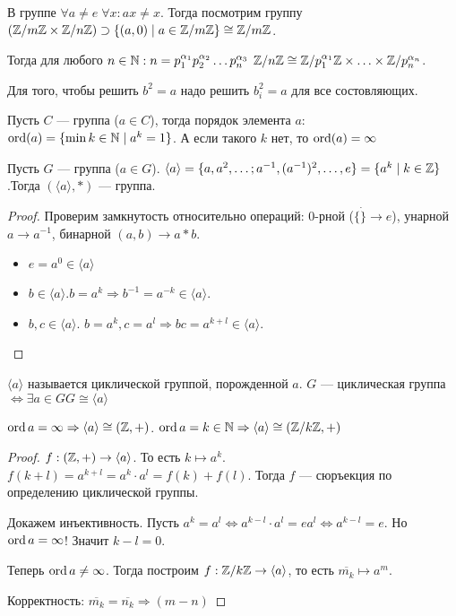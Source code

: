 В группе $\forall a \neq e\; \forall x: ax \neq x$. Тогда посмотрим группу  $(\mathbb{Z} / m\mathbb{Z} \times \mathbb{Z} / n\mathbb{Z}) \supset \{(a, 0) \mid a \in \mathbb{Z} / m\mathbb{Z}\} \cong \mathbb{Z} / m\mathbb{Z}$.
 
Тогда для любого $n \in \mathbb{N}: n = p_1^{\alpha_1} p_2^{\alpha_2}\ldots p_n^{\alpha_3}$  $\mathbb{Z} / n\mathbb{Z} \cong \mathbb{Z} / p_1^{\alpha_1}\mathbb{Z} \times \ldots \times \mathbb{Z} / p_n^{\alpha_n}$.
\begin{example}
    Для того, чтобы решить $b^2 = a$ надо решить  $b_i^2 = a$ для все состовляющих.
\end{example}
\begin{definition}
    Пусть $C$ --- группа ($a \in C$), тогда порядок элемента $a$:  $\operatorname{ord}(a) = \{\min k \in \mathbb{N} \mid a^k = 1\}$. А если такого  $k$ нет, то  $\operatorname{ord}(a) = \infty$
\end{definition}
\begin{lemma}
    Пусть $G$ --- группа ($a \in G$). $\langle a \rangle = \{a, a^2,\ldots; a^{-1}, (a^{-1})^2, \ldots, e\} = \{a^k \mid k \in \mathbb{Z}\}$.Тогда $(\langle a \rangle, *)$ --- группа.
\end{lemma}
\begin{proof}
    Проверим замкнутость относительно операций: 0-рной ($\{\dot\} \to e$), унарной $a \to a^{-1}$, бинарной  $(a, b) \to a * b$.
    \begin{itemize}
        \item $e = a^0 \in \langle a \rangle$
        \item  $b \in \langle a \rangle. b = a^k \Rightarrow b^{-1} = a^{-k} \in \langle a \rangle$.
        \item  $b, c \in \langle a \rangle$.  $b = a^k, c = a^l \Rightarrow bc = a^{k+l} \in \langle a \rangle$.
    \end{itemize}
\end{proof}
\begin{definition}
    $\langle a \rangle$ называется циклической группой, порожденной  $a$.  $G$ --- циклическая группа  $ \iff \exists a \in G G \cong \langle a \rangle$
\end{definition}
\begin{theorem}
    $\operatorname{ord} a = \infty \Rightarrow \langle a \rangle \cong (\mathbb{Z}, +)$.  $\operatorname{ord} a = k \in \mathbb{N} \Rightarrow \langle a \rangle \cong (\mathbb{Z} / k\mathbb{Z}, +)$
\end{theorem}
\begin{proof}
    $f: (\mathbb{Z}, +) \to \langle a \rangle$. То есть  $k \mapsto a^k$.  $f(k+l) = a^{k+l} = a^k \cdot a^l = f(k) + f(l)$. Тогда $f$ --- сюръекция по определению циклической группы.

    Докажем инъективность. Пусть $a^k = a^l \iff a^{k-l} \cdot a^l = e a^l \iff a^{k-l} = e$. Но  $\operatorname{ord} a = \infty$! Значит $k-l=0$.  

    Теперь $\operatorname{ord} a \neq \infty$. Тогда построим  $f: \mathbb{Z} / k \mathbb{Z} \to \langle a \rangle$, то есть  $\overline{m_k} \mapsto a^m$.

    Корректность:  $\overline{m_k} = \overline{n_k} \Rightarrow (m - n) $
\end{proof}
